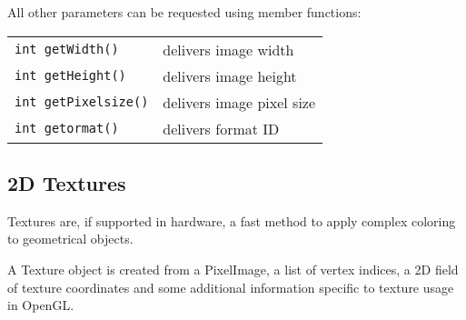 All other parameters can be requested using member functions:

\begin{longtable}{p{5.5cm} p{5.5cm}}
{\tt int getWidth()}     &   	delivers image width  \\

{\tt int getHeight()}    &  	delivers image height \\

{\tt int getPixelsize()} & 	delivers image pixel size \\

{\tt int getormat()}    &  	delivers format ID \endhead
\end{longtable}




\subsection{2D Textures}

Textures are, if supported in hardware, a fast method to apply complex coloring 
to geometrical objects. 

A Texture object is created from a PixelImage, a list of vertex indices, 
a 2D field of texture coordinates  and some additional information specific to 
texture usage in OpenGL. 


